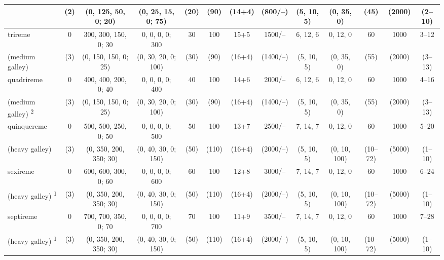 \documentclass{article}
\begin{document}
\begin{landscape}
\begin{tabular}{l|ccc|ccccc|cccc}
                      & (2) &   (0, 125,  50,   0; 20) & (0, 25, 15,  0;   75) &  (20) &  (90) &   (14+4)   &  (800/--) &  (5, 10,  5) &   (0,  35,   0) & (45) & (2000) & (2--10) \\
\hline %
trireme               &  0  &  300, 300, 150,   0; 30  &  0,  0,  0,  0;  300  &   30  &  100  &    15+5    &  1500/--  &   6, 12,  6  &    0,  12,   0  &  60  &  1000  &  3--12  \\ (medium galley)
                      & (3) &   (0, 150, 150,   0; 25) & (0, 30, 20,  0;  100) &  (30) &  (90) &   (16+4)   & (1400/--) &  (5, 10,  5) &   (0,  35,   0) & (55) & (2000) & (3--13) \\
\hline %
quadrireme            &  0  &  400, 400, 200,   0; 40  &  0,  0,  0,  0;  400  &   40  &  100  &    14+6    &  2000/--  &   6, 12,  6  &    0,  12,   0  &  60  &  1000  &  4--16  \\ (medium galley)
\textsuperscript{2}   & (3) &   (0, 150, 150,   0; 25) & (0, 30, 20,  0;  100) &  (30) &  (90) &   (16+4)   & (1400/--) &  (5, 10,  5) &   (0,  35,   0) & (55) & (2000) & (3--13) \\
\hline  %
quinquereme           &  0  &  500, 500, 250,   0; 50  &  0,  0,  0,  0;  500  &   50  &  100  &    13+7    &  2500/--  &   7, 14,  7  &    0,  12,   0  &  60  &  1000  &  5--20  \\ (heavy galley)
                      & (3) &   (0, 350, 200, 350; 30) & (0, 40, 30,  0;  150) &  (50) & (110) &   (16+4)   & (2000/--) &  (5, 10,  5) &   (0,  10, 100) & (10--72) & (5000) & (1--10) \\
\hline %
sexireme              &  0  &  600, 600, 300,   0; 60  &  0,  0,  0,  0;  600  &   60  &  100  &    12+8    &  3000/--  &   7, 14,  7  &    0,  12,   0  &  60  &  1000  &  6--24  \\ (heavy galley)
\textsuperscript{1}   & (3) &   (0, 350, 200, 350; 30) & (0, 40, 30,  0;  150) &  (50) & (110) &   (16+4)   & (2000/--) &  (5, 10,  5) &   (0,  10, 100) & (10--72) & (5000) & (1--10) \\
\hline %
septireme             &  0  &  700, 700, 350,   0; 70  &  0,  0,  0,  0;  700  &   70  &  100  &    11+9    &  3500/--  &   7, 14,  7  &    0,  12,   0  &  60  &  1000  &  7--28  \\ (heavy galley)
\textsuperscript{1}   & (3) &   (0, 350, 200, 350; 30) & (0, 40, 30,  0;  150) &  (50) & (110) &   (16+4)   & (2000/--) &  (5, 10,  5) &   (0,  10, 100) & (10--72) & (5000) & (1--10) \\

\end{tabular}
\end{landscape}
\end{document}
